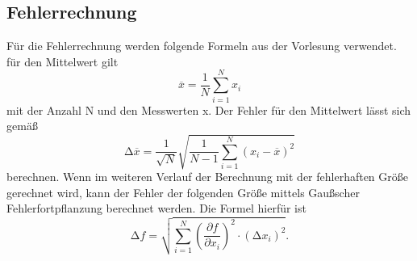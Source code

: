 \subsection{Fehlerrechnung}
\label{sec:Fehlerrechnung}
Für die Fehlerrechnung werden folgende Formeln aus der Vorlesung verwendet.
für den Mittelwert gilt
\begin{equation}
    \overline{x}=\frac{1}{N}\sum_{i=1}^N x_i
    \label{eqn:Mittelwert}
\end{equation}
mit der Anzahl N und den Messwerten x.
Der Fehler für den Mittelwert lässt sich gemäß
\begin{equation}
    \increment \overline{x}=\frac{1}{\sqrt{N}}\sqrt{\frac{1}{N-1}\sum_{i=1}^N(x_i-\overline{x})^2}
    \label{eqn:FehlerMittelwert}
\end{equation}
berechnen.
Wenn im weiteren Verlauf der Berechnung mit der fehlerhaften Größe gerechnet wird, kann der Fehler der folgenden Größe
mittels Gaußscher Fehlerfortpflanzung berechnet werden. Die Formel hierfür ist
\begin{equation}
    \increment f= \sqrt{\sum_{i=1}^N\left(\frac{\partial f}{\partial x_i}\right)^2\cdot(\increment x_i)^2}.
    \label{eqn:GaussMittelwert}
\end{equation}